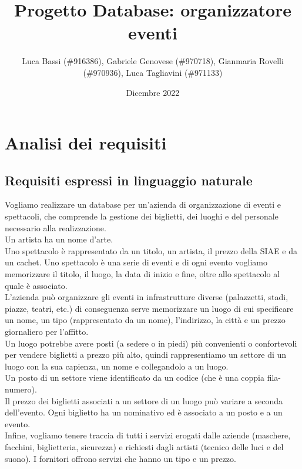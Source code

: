 \documentclass[a4paper,11pt]{article}
\title{Progetto Database: organizzatore eventi}
\author{Luca Bassi (\#916386), Gabriele Genovese (\#970718), Gianmaria Rovelli (\#970936), Luca Tagliavini (\#971133)}
\date{Dicembre 2022}
\begin{document}
\maketitle

\tableofcontents

\newpage

\section{Analisi dei requisiti}

\subsection{Requisiti espressi in linguaggio naturale}

Vogliamo realizzare un database per un'azienda di organizzazione di eventi e spettacoli, che comprende la gestione dei biglietti, dei luoghi e del personale necessario alla realizzazione.\\
Un artista ha un nome d'arte.\\
Uno spettacolo è rappresentato da un titolo, un artista, il prezzo della SIAE e da un cachet. Uno spettacolo è una serie di eventi e di ogni evento vogliamo memorizzare il titolo, il luogo, la data di inizio e fine, oltre allo spettacolo al quale è associato.\\
L'azienda può organizzare gli eventi in infrastrutture diverse (palazzetti, stadi, piazze, teatri, etc.) di conseguenza serve memorizzare un luogo di cui specificare un nome, un tipo (rappresentato da un nome), l'indirizzo, la città e un prezzo giornaliero per l'affitto.\\
Un luogo potrebbe avere posti (a sedere o in piedi) più convenienti o confortevoli per vendere biglietti a prezzo più alto, quindi rappresentiamo un settore di un luogo con la sua capienza, un nome e collegandolo a un luogo.\\
Un posto di un settore viene identificato da un codice (che è una coppia fila-numero).\\
Il prezzo dei biglietti associati a un settore di un luogo può variare a seconda dell'evento. Ogni biglietto ha un nominativo ed è associato a un posto e a un evento.\\
Infine, vogliamo tenere traccia di tutti i servizi erogati dalle aziende (maschere, facchini, biglietteria, sicurezza) e richiesti dagli artisti (tecnico delle luci e del suono). I fornitori offrono servizi che hanno un tipo e un prezzo.
\end{document}
